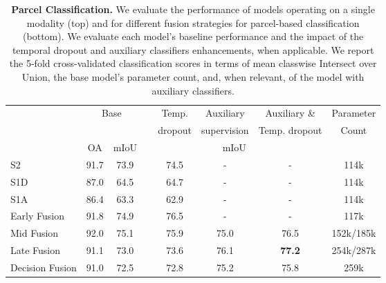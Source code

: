 \begin{table}[ht!]
\caption{\textbf{Parcel Classification.} We evaluate the performance of models operating on a single modality (top) and for different fusion strategies for parcel-based classification (bottom). We evaluate each model's baseline performance and the impact of the temporal dropout and auxiliary classifiers enhancements, when applicable. We report the 5-fold cross-validated classification scores in terms of mean classwise Intersect over Union, the base model's parameter count, and, when relevant, of the model with auxiliary classifiers.}
\label{tab:xp:parcelbased}
\begin{tabular}{lccccccc}
\toprule
         & \multicolumn{2}{c}{\multirow{2}{*}{Base}} &\,& Temp. & Auxiliary   & Auxiliary \&     &      Parameter      \\
         &       &&                  & dropout  & supervision & Temp. dropout &      Count      \\  \cline{2-3} \cline{5-7}
         &OA&mIoU& \multicolumn{4}{c}{mIoU} \\
         \midrule
S2       & 91.7 &73.9                  && 74.5     & -           & -                &       114k    \\
S1D      & 87.0&64.5                  && 64.7     & -           & -                &       114k     \\
S1A      & 86.4&63.3                  && 62.9     & -           & -                &       114k    \\\midrule
Early Fusion  &91.8  &74.9                  && 76.5       & -           & -                &       117k     \\
Mid Fusion   & 92.0 &75.1                  && 75.9     &      75.0       & 76.5             &       152k/185k    \\
Late Fusion  & 91.1&73.0                  &&   73.6       & 76.1        & \textbf{77.2}             &       254k/287k    \\
Decision Fusion & 91.0 &72.5                  &&   72.8       & 75.2        & 75.8            &        259k    \\ \bottomrule
\end{tabular}
\end{table}

